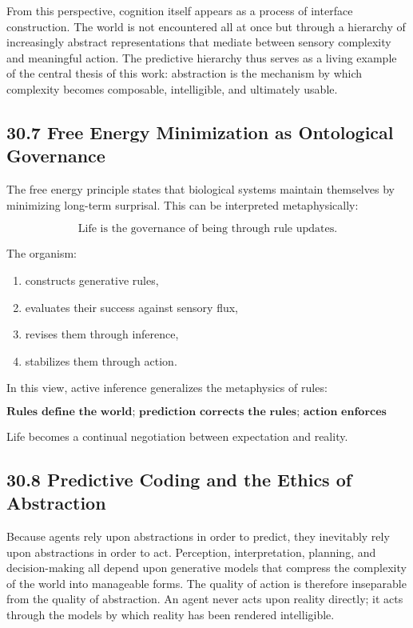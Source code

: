 \documentclass[12pt,letterpaper]{article}
\theoremstyle{remark}
\begin{document}
From this perspective, cognition itself appears as a process of interface construction. The world is not encountered all at once but through a hierarchy of increasingly abstract representations that mediate between sensory complexity and meaningful action. The predictive hierarchy thus serves as a living example of the central thesis of this work: abstraction is the mechanism by which complexity becomes composable, intelligible, and ultimately usable.

\subsection{30.7 Free Energy Minimization as Ontological Governance}

The free energy principle states that biological systems maintain themselves by minimizing long-term surprisal. This can be interpreted metaphysically:

\[
\text{Life is the governance of being through rule updates.}
\]

The organism:

\begin{enumerate}
    \item constructs generative rules,
    \item evaluates their success against sensory flux,
    \item revises them through inference,
    \item stabilizes them through action.
\end{enumerate}

In this view, active inference generalizes the metaphysics of rules:

\[
\textbf{Rules define the world; prediction corrects the rules; action enforces them.}
\]

Life becomes a continual negotiation between expectation and reality.

\subsection{30.8 Predictive Coding and the Ethics of Abstraction}

Because agents rely upon abstractions in order to predict, they inevitably rely upon abstractions in order to act. Perception, interpretation, planning, and decision-making all depend upon generative models that compress the complexity of the world into manageable forms. The quality of action is therefore inseparable from the quality of abstraction. An agent never acts upon reality directly; it acts through the models by which reality has been rendered intelligible.
\end{document}
